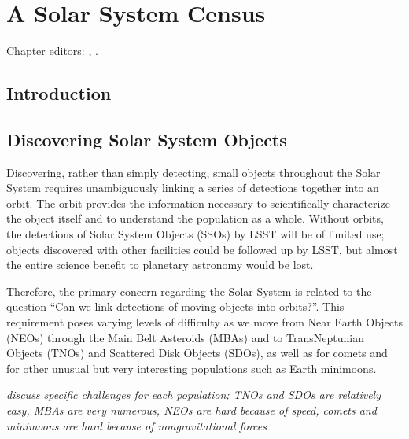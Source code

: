 \chapter[Solar System]{A Solar System Census}
\def\chpname{solarsystem}\label{chp:\chpname}

Chapter editors:
,
.


\section{Introduction}
\label{sec:\chpname:intro}



\section{Discovering Solar System Objects}
\def\secname{\chpname:discovery}\label{sec:\secname}

Discovering, rather than simply detecting, small objects throughout
the Solar System requires unambiguously linking a series of detections
together into an orbit. The orbit provides the information necessary
to scientifically characterize the object itself and to understand the
population as a whole. Without orbits, the detections of Solar System
Objects (SSOs) by LSST will be of limited use; objects discovered with
other facilities could be followed up by LSST, but almost the entire
science benefit to planetary astronomy would be lost.

Therefore, the primary concern regarding the Solar System is related
to the question ``Can we link detections of moving objects into
orbits?''.  This requirement poses varying levels of difficulty as we
move from Near Earth Objects (NEOs) through the Main Belt Asteroids
(MBAs) and to TransNeptunian Objects (TNOs) and Scattered Disk Objects
(SDOs), as well as for comets and for other unusual but very
interesting populations such as Earth minimoons.

{\it discuss specific challenges for each population; TNOs and SDOs are
  relatively easy, MBAs are very numerous, NEOs are hard because of
  speed, comets and minimoons are hard because of nongravitational forces}


